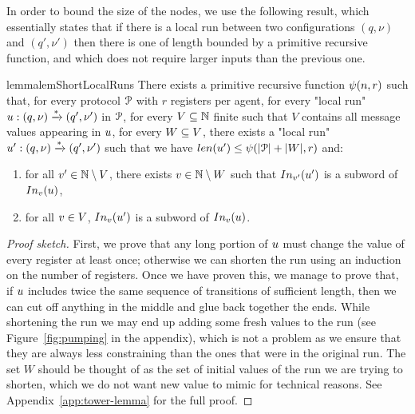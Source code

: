 In order to bound the size of the nodes, we use the following result, which essentially states that if there is a local run between two configurations $(q, \nu)$ and $(q', \nu')$ then there is one of length bounded by a primitive recursive function, and which does not require larger inputs than the previous one.

\begin{restatable}{lemma}{lemShortLocalRuns}
	\label{lem:short-local-runs}
	There exists a primitive recursive function $\psi(n,r)$ such that, for every protocol $\mathcal{P}$ with $r$ registers per agent, for every "local run" $u: (q, \nu) \xrightarrow{*} (q', \nu')$ in $\mathcal{P}$, for every $V \subseteq \mathbb{N}$ finite such that $V$ contains all message values appearing in $u$,  for every $W \subseteq V$, there exists a "local run" $u': (q, \nu) \xrightarrow{*} (q', \nu')$ such that we have $\length{\localrun'} \leq \towerfun(\size{\prot} + \size{\Vinit},r)$ and:
	\begin{enumerate}
		\item \label{item:shorterrun_anyvalue} for all $v' \in \mathbb{N} \setminus V$, there exists $v \in \mathbb{N} \setminus W$ such that $\vinput{\aval'}{\localrun'}$ is a subword of $\vinput{\aval}{\localrun}$,
		\item \label{item:shorterrun_oldvalues} for all $v \in V$, $\vinput{\aval}{\localrun'}$ is a subword of $\vinput{\aval}{\localrun}$. 
	\end{enumerate}
\end{restatable}

\begin{proof}[Proof sketch]
	First, we prove that any long portion of $u$ must change the value of every register at least once; otherwise we can shorten the run using an induction on the number of registers. Once we have proven this, we manage to prove that, if $u$ includes twice the same sequence of transitions of sufficient length, then we can cut off anything in the middle and glue back together the ends. While shortening the run we may end up adding some fresh values to the run (see Figure~\ref{fig:pumping} in the appendix), which is not a problem as we ensure that they are always less constraining than the ones that were in the original run. The set $W$ should be thought of as the set of initial values of the run we are trying to shorten, which we do not want new value to mimic for technical reasons.
	See Appendix~\ref{app:tower-lemma} for the full proof.
\end{proof}




